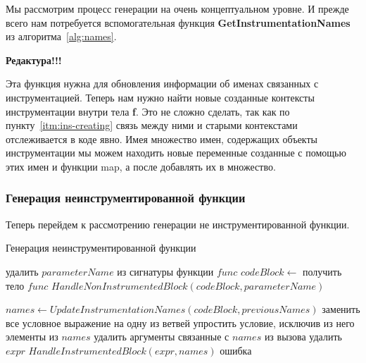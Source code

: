Мы рассмотрим процесс генерации на очень концептуальном уровне.
И прежде всего нам потребуется вспомогательная функция
\textbf{GetInstrumentationNames} из алгоритма~\ref{alg:names}.

\textbf{Редактура!!!}

Эта функция нужна для обновления информации об именах связанных с инструментацией.
Теперь нам нужно найти новые созданные контексты инструментации внутри
тела \textbf{f}.
Это не сложно сделать, так как по пункту~\ref{itm:ins-creating} связь между ними
и старыми контекстами отслеживается в коде явно.
Имея множество имен, содержащих объекты инструментации мы можем находить новые
переменные созданные с помощью этих имен и функции map, а после добавлять их в
множество.

\subsubsection{Генерация неинструментированной функции}

Теперь перейдем к рассмотрению генерации не инструментированной функции.

\begin{algorithm}
\caption{Генерация неинструментированной функции}\label{alg:nonins}
\begin{algorithmic}[1]
  \State удалить $parameterName$ из сигнатуры функции $func$
  \State $codeBlock \gets$ получить тело $func$
  \State $HandleNonInstrumentedBlock(codeBlock, parameterName)$
\EndFunction

  \State $names \gets UpdateInstrumentationNames(codeBlock, previousNames)$
      \State заменить все условное выражение на одну из ветвей
      \State упростить условие, исключив из него элементы из $names$
      \State удалить аргументы связанные с $names$ из вызова
      \State удалить $expr$
      \State $HandleInstrumentedBlock(expr, names)$
      \State \Return ошибка
    \EndIf
  \EndFor
\EndFunction
\end{algorithmic}
\end{algorithm}

